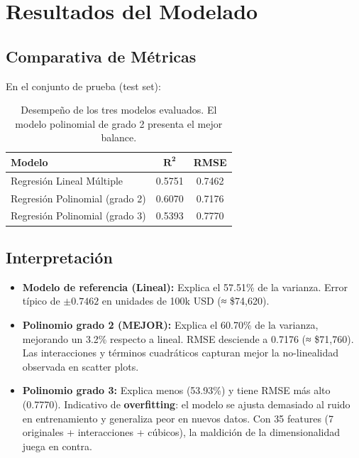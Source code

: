\documentclass[11pt,a4paper]{article}
\begin{document}
\newpage

\section{Resultados del Modelado}

\subsection{Comparativa de Métricas}

En el conjunto de prueba (test set):

\begin{table}[ht]
\centering
\begin{tabular}{lcc}
\hline
\textbf{Modelo} & $\mathbf{R^2}$ & \textbf{RMSE} \\
\hline
Regresión Lineal Múltiple & 0.5751 & 0.7462 \\
Regresión Polinomial (grado 2) & 0.6070 & 0.7176 \\
Regresión Polinomial (grado 3) & 0.5393 & 0.7770 \\
\hline
\end{tabular}
\caption{Desempeño de los tres modelos evaluados. El modelo polinomial de grado 2 presenta el mejor balance.}
\end{table}

\subsection{Interpretación}

\begin{itemize}
  \item \textbf{Modelo de referencia (Lineal):} Explica el 57.51\% de la varianza. Error típico de $\pm 0.7462$ en unidades de 100k USD (≈ \$74,620).
  
  \item \textbf{Polinomio grado 2 (MEJOR):} Explica el 60.70\% de la varianza, mejorando un 3.2\% respecto a lineal. RMSE desciende a 0.7176 (≈ \$71,760). 
    Las interacciones y términos cuadráticos capturan mejor la no-linealidad observada en scatter plots.
  
  \item \textbf{Polinomio grado 3:} Explica menos (53.93\%) y tiene RMSE más alto (0.7770). 
    Indicativo de \textbf{overfitting}: el modelo se ajusta demasiado al ruido en entrenamiento
    y generaliza peor en nuevos datos. Con 35 features (7 originales + interacciones + cúbicos), 
    la maldición de la dimensionalidad juega en contra.
\end{itemize}
\end{document}

